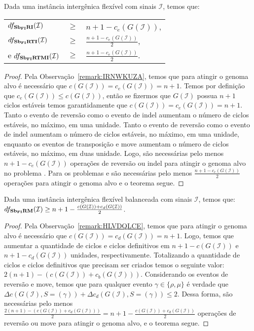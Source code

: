 \begin{theorem}\label{theorem:SZNBDWOM}
Dada uma instância intergênica flexível com sinais $\mathcal{I}$, temos que:

\begin{tabular}{lll}
  $df_{\textbf{Sb\textsubscript{FI}RI}}(\mathcal{I})$       & $ \ge $ & ${n+1} - c_e(G(\mathcal{I} ))$, \\
  $df_{\textbf{Sb\textsubscript{FI}RTI}}(\mathcal{I})$      & $ \ge $ & $\frac{{n+1} - c_e(G(\mathcal{I} ))}{2}$, \\
  e $df_{\textbf{Sb\textsubscript{FI}RTMI}}(\mathcal{I})$   & $ \ge $ & $\frac{{n+1} - c_e(G(\mathcal{I} ))}{2}$. \\
\end{tabular}
\end{theorem}
\begin{proof}
Pela Observação~\ref{remark:IRNWKUZA}, temos que para atingir o genoma alvo é necessário que $c(G(\mathcal{I})) = c_e(G(\mathcal{I})) = n+1$. Temos por definição que $c_e(G(\mathcal{I})) \le c(G(\mathcal{I}))$, então se fizermos que $G(\mathcal{I})$ possua $n+1$ ciclos estáveis temos garantidamente que $c(G(\mathcal{I})) = c_e(G(\mathcal{I})) = n+1$. Tanto o evento de reversão como o evento de indel aumentam o número de ciclos estáveis, no máximo, em uma unidade. Tanto o evento de reversão como o evento de indel aumentam o número de ciclos estáveis, no máximo, em uma unidade, enquanto os eventos de transposição e move aumentam o número de ciclos estáveis, no máximo, em duas unidade. Logo, são necessárias pelo menos ${n+1} - c_e(G(\mathcal{I} ))$ operações de reversão ou indel para atingir o genoma alvo no problema \SbFIRI{}. Para os problemas \SbFIRTI{} e \SbFIRTMI{} são necessárias pelo menos $\frac{{n+1} - c_e(G(\mathcal{I} ))}{2}$ operações para atingir o genoma alvo e o teorema segue. 
\end{proof}

\begin{theorem}\label{theorem:CNMFNKPK}
Dada uma instância intergênica flexível balanceada com sinais $\mathcal{I}$, temos que: $df_{\textbf{Sb\textsubscript{FI}RM}}(\mathcal{I}) \ge {n+1} - \frac{c(G(\mathcal{I} )) + c_d(G(\mathcal{I} ))}{2}$.
\end{theorem}
\begin{proof}
Pela Observação~\ref{remark:HLVDQLCE}, temos que para atingir o genoma alvo é necessário que $c(G(\mathcal{I})) = c_d(G(\mathcal{I})) = n+1$. Logo, temos que aumentar a quantidade de ciclos e ciclos definitivos em ${n+1} - c(G(\mathcal{I}))$ e ${n+1} - c_d(G(\mathcal{I}))$ unidades, respectivamente. Totalizando a quantidade de ciclos e ciclos definitivos que precisam ser criados temos o seguinte valor: $2(n+1) - (c(G(\mathcal{I})) + c_b(G(\mathcal{I})))$. Considerando os eventos de reversão e move, temos que para qualquer evento $\gamma \in \{\rho, \mu\}$ é verdade que $\Delta c(G(\mathcal{I}), S=(\gamma)) + \Delta c_d(G(\mathcal{I}), S=(\gamma)) \le 2$. Dessa forma, são necessárias pelo menos $\frac{2({n+1}) - (c(G(\mathcal{I})) + c_d(G(\mathcal{I})))}{2} = {n+1} - \frac{c(G(\mathcal{I} )) + c_d(G(\mathcal{I} ))}{2}$ operações de reversão ou move para atingir o genoma alvo, e o teorema segue. 
\end{proof}

